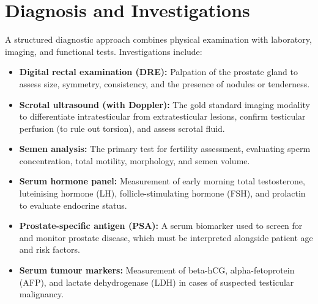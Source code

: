 \section*{Diagnosis and Investigations}
A structured diagnostic approach combines physical examination with laboratory, imaging, and functional tests. Investigations include:
\begin{itemize}
    \item \textbf{Digital rectal examination (DRE):} Palpation of the prostate gland to assess size, symmetry, consistency, and the presence of nodules or tenderness.
    \item \textbf{Scrotal ultrasound (with Doppler):} The gold standard imaging modality to differentiate intratesticular from extratesticular lesions, confirm testicular perfusion (to rule out torsion), and assess scrotal fluid.
    \item \textbf{Semen analysis:} The primary test for fertility assessment, evaluating sperm concentration, total motility, morphology, and semen volume.
    \item \textbf{Serum hormone panel:} Measurement of early morning total testosterone, luteinising hormone (LH), follicle-stimulating hormone (FSH), and prolactin to evaluate endocrine status.
    \item \textbf{Prostate-specific antigen (PSA):} A serum biomarker used to screen for and monitor prostate disease, which must be interpreted alongside patient age and risk factors.
    \item \textbf{Serum tumour markers:} Measurement of beta-hCG, alpha-fetoprotein (AFP), and lactate dehydrogenase (LDH) in cases of suspected testicular malignancy.
\end{itemize}

